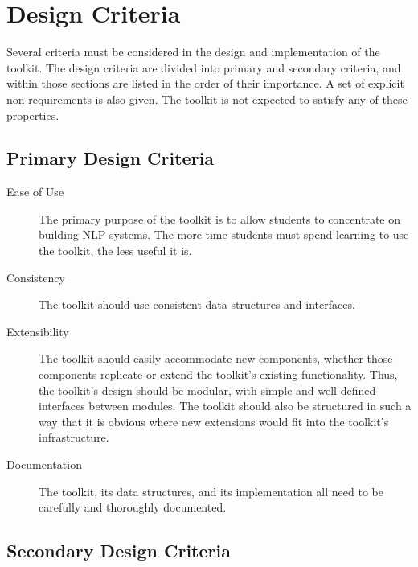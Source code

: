 \documentclass{article}
\begin{document}
\section{Design Criteria}

Several criteria must be considered in the design and implementation
of the toolkit.  The design criteria are divided into primary and
secondary criteria, and within those sections are listed in the order
of their importance.  A set of explicit non-requirements is also
given.  The toolkit is not expected to satisfy any of these
properties. 

\subsection{Primary Design Criteria}

\begin{description}

\item[Ease of Use] The primary purpose of the toolkit is to allow
students to concentrate on building NLP systems.  The more time
students must spend learning to use the toolkit, the less useful it
is.  

\item[Consistency] The toolkit should use consistent data structures
and interfaces.

\item[Extensibility] The toolkit should easily accommodate new
components, whether those components replicate or extend the toolkit's
existing functionality.  Thus, the toolkit's design should be modular,
with simple and well-defined interfaces between modules.  The toolkit
should also be structured in such a way that it is obvious where new
extensions would fit into the toolkit's infrastructure.

\item[Documentation] The toolkit, its data structures, and its
implementation all need to be carefully and thoroughly documented.

\end{description}

\subsection{Secondary Design Criteria}
\end{document}
